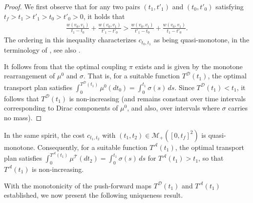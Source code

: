 \documentclass[11pt]{article}
\newcommand{\calT}{{\mathcal T}}
\begin{document}
\begin{proof}
We first observe that for any two pairs $(t_1,t'_1)$ and $(t_0,t'_0)$ satisfying
$t_f > t_1 > t'_1 > t_0 > t'_0 > 0$,
it holds that
\begin{align*}
\frac{w(v_0,v_1)}{t_1 - t_0} + \frac{w(v_0,v_1)}{t'_1 - t'_0} > \frac{w(v_0,v_1)}{t'_1 - t_0} + \frac{w(v_0,v_1)}{t_1 - t'_0}.
\end{align*}
The ordering in this inequality characterizes $c_{t_0,t_1}$ as being quasi-monotone, in the terminology of \cite{cambanis1976inequalities}, see also \cite[Section 3.1]{rachev1998mass}.

It follows from \cite[Theorem 2.18 and Remark 2.19]{villani2021topics} that the optimal coupling $\pi$ exists and is given by the monotone rearrangement of $\mu^0$ and $\sigma$. That is, for a suitable function $T^{\mathcal D}(t_1)$, the optimal transport plan satisfies $ \int_{0}^{T^{\mathcal D}(t_1)}\mu^0(dt_0) =  \int_0^{t_1} \sigma(s)\,ds$.
Since $T^{\mathcal D}(t_1) < t_1$, it follows that $T^{\mathcal D}(t_1)$ is non-increasing  (and remains constant over time intervals corresponding to Dirac components of $\mu^0$, and also, over intervals where $\sigma$ carries no mass).
\end{proof}

In the same spirit, the cost $c_{t_1,t_2}$ with $(t_1,t_2) \in \mathcal M_+([0, t_f]^2)$ is quasi-monotone. Consequently, for a suitable function $T^{\mathcal A}(t_1)$, the optimal transport plan satisfies
$\int_0^{T^{\mathcal A}(t_1)} \mu^\calT(dt_2) =  \int_0^{t_1} \sigma(s)\,ds$
for $T^{\mathcal A}(t_1)>t_1$, so that $T^\mathcal{A}(t_1)$ is non-increasing. 

With the monotonicity of the push-forward maps $T^{\mathcal{D}}(t_1)$ and $T^{\mathcal{A}}(t_1)$ established, we now present the following uniqueness result.
\end{document}
